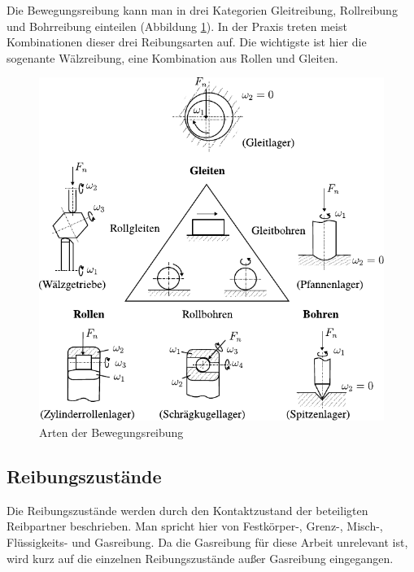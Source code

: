 Die Bewegungsreibung kann man in drei Kategorien Gleitreibung, Rollreibung und Bohrreibung einteilen (Abbildung \ref{fig:arten_der_bewegungsreibung}).
In der Praxis treten meist Kombinationen dieser drei Reibungsarten auf.
Die wichtigste ist hier die sogenante Wälzreibung, eine Kombination aus Rollen und Gleiten.
\begin{figure}[htb]
    \centering
    \includegraphics[]{./images/bewegungsarten.pdf}
    \caption{Arten der Bewegungsreibung \cite{steinhilper_2008}}
    \label{fig:arten_der_bewegungsreibung}
\end{figure}
%

\subsection{Reibungszustände}
\label{sub:reibungszustaende}

Die Reibungszustände werden durch den Kontaktzustand der beteiligten Reibpartner beschrieben.
Man spricht hier von Festkörper-, Grenz-, Misch-, Flüssigkeits- und Gasreibung.
Da die Gasreibung für diese Arbeit unrelevant ist, wird kurz auf die einzelnen Reibungszustände außer Gasreibung eingegangen.

